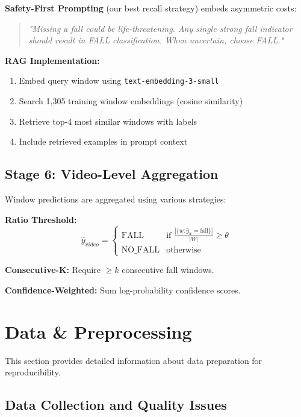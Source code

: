 \documentclass[conference]{IEEEtran}
\begin{document}
\textbf{Safety-First Prompting} (our best recall strategy) embeds asymmetric costs:
\begin{quote}
\textit{"Missing a fall could be life-threatening. Any single strong fall indicator should result in FALL classification. When uncertain, choose FALL."}
\end{quote}

\textbf{RAG Implementation:}
\begin{enumerate}
    \item Embed query window using \texttt{text-embedding-3-small}
    \item Search 1,305 training window embeddings (cosine similarity)
    \item Retrieve top-4 most similar windows with labels
    \item Include retrieved examples in prompt context
\end{enumerate}

\subsection{Stage 6: Video-Level Aggregation}

Window predictions are aggregated using various strategies:

\textbf{Ratio Threshold:}
\begin{equation}
\hat{y}_{video} = \begin{cases}
\text{FALL} & \text{if } \frac{|\{w : \hat{y}_w = \text{fall}\}|}{|W|} \geq \theta \\
\text{NO\_FALL} & \text{otherwise}
\end{cases}
\end{equation}

\textbf{Consecutive-K:} Require $\geq k$ consecutive fall windows.

\textbf{Confidence-Weighted:} Sum log-probability confidence scores.

\section{Data \& Preprocessing}

This section provides detailed information about data preparation for reproducibility.

\subsection{Data Collection and Quality Issues}
\end{document}
